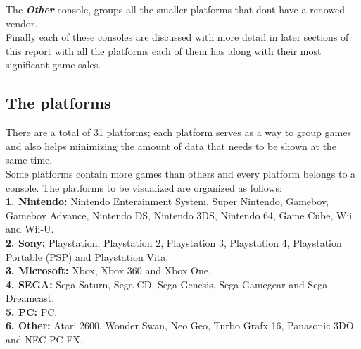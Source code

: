 The \textit{\textbf{Other}} console, groups all the smaller platforms that
dont have a renowed vendor.\\

Finally each of these consoles are discussed with more detail in later
sections of this report with all the platforms each of them has along with
their most significant game sales.


\subsection{The platforms}
There are a total of 31 platforms; each platform serves as a way to group
games and also helps minimizing the amount of data that needs to be shown
at the same time.\\

Some platforms contain more games than others and every platform belongs to a
console. The platforms to be visualized are organized as follows:\\
\textbf{1. Nintendo:} Nintendo Enterainment System, Super Nintendo, Gameboy,
Gameboy Advance, Nintendo DS, Nintendo 3DS, Nintendo 64, Game Cube, Wii and
Wii-U.\\
\textbf{2. Sony:} Playstation, Playstation 2, Playstation 3, Playstation 4,
Playstation Portable (PSP) and Playstation Vita.\\
\textbf{3. Microsoft:} Xbox, Xbox 360 and Xbox One.\\
\textbf{4. SEGA:} Sega Saturn, Sega CD, Sega Genesis, Sega Gamegear and Sega Dreamcast.\\
\textbf{5. PC:} PC.\\
\textbf{6. Other:} Atari 2600, Wonder Swan, Neo Geo, Turbo Grafx 16,
Panasonic 3DO and NEC PC-FX.


